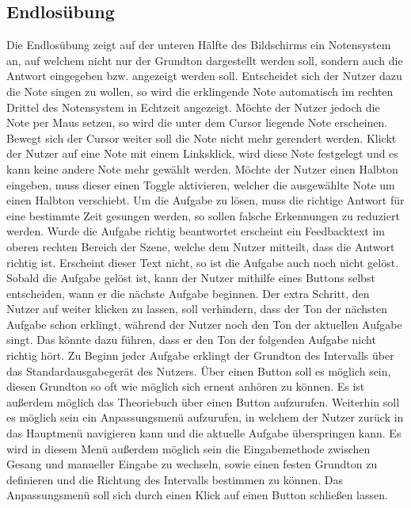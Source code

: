\subsection{Endlosübung}
Die Endlosübung zeigt auf der unteren Hälfte des Bildschirms ein Notensystem an, auf welchem nicht nur der Grundton dargestellt werden soll, sondern auch die Antwort eingegeben bzw. angezeigt werden soll. Entscheidet sich der Nutzer dazu die Note singen zu wollen, so wird die erklingende Note automatisch im rechten Drittel des Notensystem in Echtzeit angezeigt. Möchte der Nutzer jedoch die Note per Maus setzen, so wird die unter dem Cursor liegende Note erscheinen. Bewegt sich der Cursor weiter soll die Note nicht mehr gerendert werden. Klickt der Nutzer auf eine Note mit einem Linksklick, wird diese Note festgelegt und es kann keine andere Note mehr gewählt werden. Möchte der Nutzer einen Halbton eingeben, muss dieser einen Toggle aktivieren, welcher die ausgewählte Note um einen Halbton verschiebt. Um die Aufgabe zu lösen, muss die richtige Antwort für eine bestimmte Zeit gesungen werden, so sollen falsche Erkennungen zu reduziert werden. Wurde die Aufgabe richtig beantwortet erscheint ein Feedbacktext im oberen rechten Bereich der Szene, welche dem Nutzer mitteilt, dass die Antwort richtig ist. Erscheint dieser Text nicht, so ist die Aufgabe auch noch nicht gelöst. Sobald die Aufgabe gelöst ist, kann der Nutzer mithilfe eines Buttons selbst entscheiden, wann er die nächste Aufgabe beginnen. Der extra Schritt, den Nutzer auf weiter klicken zu lassen, soll verhindern, dass der Ton der nächsten Aufgabe schon erklingt, während der Nutzer noch den Ton der aktuellen Aufgabe singt. Das könnte dazu führen, dass er den Ton der folgenden Aufgabe nicht richtig hört. Zu Beginn jeder Aufgabe erklingt der Grundton des Intervalls über das Standardausgabegerät des Nutzers. Über einen Button soll es möglich sein, diesen Grundton so oft wie möglich sich erneut anhören zu können. Es ist außerdem möglich das Theoriebuch über einen Button aufzurufen. Weiterhin soll es möglich sein ein Anpassungsmenü aufzurufen, in welchem der Nutzer zurück in das Hauptmenü navigieren kann und die aktuelle Aufgabe überspringen kann. Es wird in diesem Menü außerdem möglich sein die Eingabemethode zwischen Gesang und manueller Eingabe zu wechseln, sowie einen festen Grundton zu definieren und die Richtung des Intervalls bestimmen zu können. Das Anpassungsmenü soll sich durch einen Klick auf einen Button schließen lassen. 

